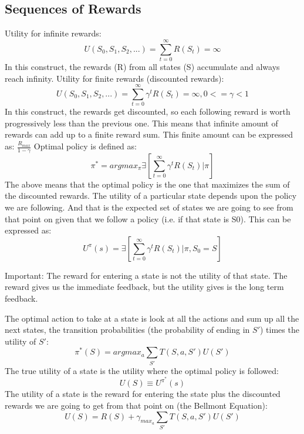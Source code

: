 \documentclass{article}
\begin{document}
\subsection{Sequences of Rewards}
Utility for infinite rewards:
\begin{equation*}
  U(S_0, S_1, S_2, ...) = \sum_{t=0}^{\infty} R(S_t) = \infty
\end{equation*}
In this construct, the rewards (R) from all states (S) accumulate and always reach infinity.
Utility for finite rewards (discounted rewards):
\begin{equation*}
  U(S_0, S_1, S_2, ...) = \sum_{t=0}^{\infty} \gamma^t R(S_t) = \infty, 0 <= \gamma < 1
\end{equation*}
In this construct, the rewards get discounted, so each following reward is worth progressively less than the previous one. This means that infinite amount of rewards can add up to a finite reward sum. This finite amount can be expressed as: $\frac{R_{max}}{1-\gamma}$
Optimal policy is defined as:
\begin{equation*}
  \pi^* = argmax_{\pi} \exists \left[ \sum_{t=0}^{\infty} \gamma^t R(S_t) | \pi \right]
\end{equation*}
The above means that the optimal policy is the one that maximizes the sum of the discounted rewards.
The utility of a particular state depends upon the policy we are following. And that is the expected set of states we are going to see from that point on given that we follow a policy (i.e. if that state is S0). This can be expressed as:
\begin{equation*}
  U^{\pi}(s) = \exists \left[ \sum_{t=0}^{\infty} \gamma^t R(S_t) | \pi, S_0 = S \right]
\end{equation*}
\begin{framed}
Important: The reward for entering a state is not the utility of that state. The reward gives us the immediate feedback, but the utility gives is the long term feedback.
\end{framed}
The optimal action to take at a state is look at all the actions and sum up all the next states, the transition probabilities (the probability of ending in $S'$) times the utility of $S'$:
\begin{equation*}
  \pi^*(S) = argmax_a \sum_{S'} T(S, a, S') U(S')
\end{equation*}
The true utility of a state is the utility where the optimal policy is followed:
\begin{equation*}
  U(S) \equiv U^{\pi^*}(s)
\end{equation*}
The utility of a state is the reward for entering the state plus the discounted rewards we are going to get from that point on (the Bellmont Equation):
\begin{equation}
  U(S) = R(S) + \gamma_{max_a} \sum_{S'} T(S, a, S') U(S')
\end{equation}
\end{document}
